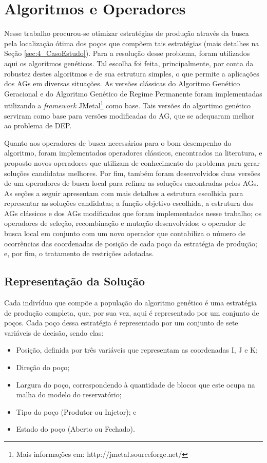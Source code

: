 \chapter{Algoritmos e Operadores}
\label{ch:3_AlgoritmosOperadores}
Nesse trabalho procurou-se otimizar estratégias de produção através da busca pela localização ótima dos poços que compõem tais estratégias (mais detalhes na Seção \ref{sec:4_CasoEstudo}). Para a resolução desse problema, foram utilizados aqui os algoritmos genéticos. Tal escolha foi feita, principalmente, por conta da robustez destes algoritmos e de sua estrutura simples, o que permite a aplicações dos AGs em diversas situações. As versões clássicas do Algoritmo Genético Geracional e do Algoritmo Genético de Regime Permanente foram implementadas utilizando a \textit{framework} JMetal\footnote{Mais informações em: http://jmetal.sourceforge.net/} como base. Tais versões do algortimo genético serviram como base para versões modificadas do AG, que se adequaram melhor ao problema de DEP.

Quanto aos operadores de busca necessários para o bom desempenho do algoritmo, foram implementados operadores clássicos, encontrados na literatura, e proposto novos operadores que utilizam de conhecimento do problema para gerar soluções candidatas melhores. Por fim, também foram desenvolvidos duas versões de um operadores de busca local para refinar as soluções encontradas pelos AGs. As seções a seguir apresentam com mais detalhes a estrutura escolhida para representar as soluções candidatas; a função objetivo escolhida, a estrutura dos AGs clássicos e dos AGs modificados que foram implementados nesse trabalho; os operadores de seleção, recombinação e mutação desenvolvidos; o operador de busca local em conjunto com um novo operador que contabiliza o número de ocorrências das coordenadas de posição de cada poço da estratégia de produção; e, por fim, o tratamento de restrições adotadas.  

\section{Representação da Solução}
\label{sec:3_Representacao}
Cada indivíduo que compõe a população do algoritmo genético é uma estratégia de produção completa, que, por sua vez, aqui é representado por um conjunto de poços. Cada poço dessa estratégia é representado por um conjunto de sete variáveis de decisão, sendo elas:

\begin{itemize}

\item Posição, definida por três variáveis que representam as coordenadas I, J e K;
\item Direção do poço;
\item Largura do poço, correspondendo à quantidade de blocos que este ocupa na malha do modelo do reservatório; 
\item Tipo do poço (Produtor ou Injetor); e
\item Estado do poço (Aberto ou Fechado).

\end{itemize}

